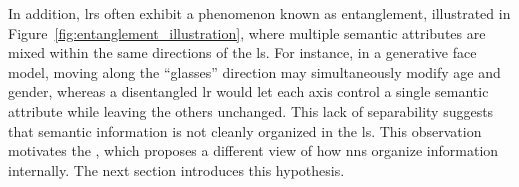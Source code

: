 In addition, \glspl{lr} often exhibit a phenomenon known as entanglement, illustrated in Figure~\ref{fig:entanglement_illustration}, where multiple semantic attributes are mixed within the same directions of the \gls{ls}.
For instance, in a generative face model, moving along the \enquote{glasses} direction may simultaneously modify age and gender, whereas a disentangled \gls{lr} would let each axis control a single semantic attribute while leaving the others unchanged.
This lack of separability suggests that semantic information is not cleanly organized in the \gls{ls}.
This observation motivates the \SuperpositionHypothesisName, which proposes a different view of how \glspl{nn} organize information internally.
The next section introduces this hypothesis.

